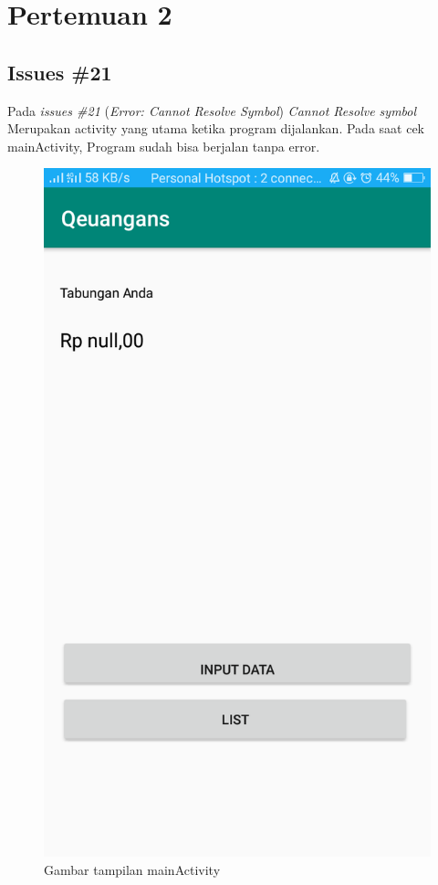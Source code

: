 \chapter{Pertemuan 2}


\section{Issues \#21}
Pada \textit{issues \#21} (\textit{Error: Cannot Resolve Symbol}) \textit{Cannot Resolve symbol} Merupakan activity yang utama ketika program dijalankan. Pada saat cek mainActivity, Program sudah bisa berjalan tanpa error. 
\begin{figure}[]
        \centering
        \includegraphics[scale = 0.3]{pictures/mainActivity.png}
        \caption{Gambar tampilan mainActivity}
        \label{mainActivity}
\end{figure}


